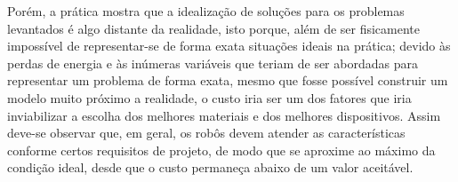 Porém, a prática mostra que a idealização de soluções para os problemas levantados é algo distante da realidade, isto porque, além de ser fisicamente impossível de representar-se de forma exata situações ideais na prática; devido às perdas de energia e às inúmeras variáveis que teriam de ser abordadas para representar um problema de forma exata, mesmo que fosse possível construir um modelo muito próximo a realidade, o custo iria ser um dos fatores que iria inviabilizar a escolha dos melhores materiais e dos melhores dispositivos. Assim deve-se observar que, em geral, os robôs devem atender as características conforme certos requisitos de projeto, de modo que se aproxime ao máximo da condição ideal, desde que o custo permaneça abaixo de um valor aceitável.  
